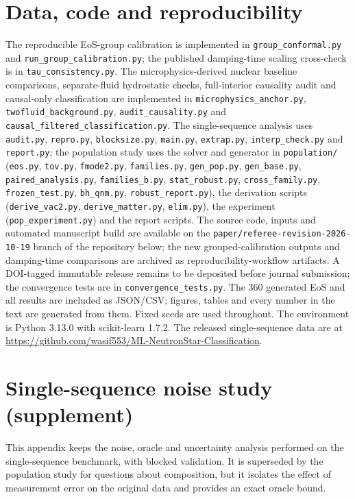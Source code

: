 \documentclass[11pt,a4paper]{article}
\begin{document}
\section*{Data, code and reproducibility}
The reproducible EoS-group calibration is implemented in \texttt{group\_conformal.py} and \texttt{run\_group\_calibration.py}; the published damping-time scaling cross-check is in \texttt{tau\_consistency.py}. The microphysics-derived nuclear baseline comparisons, separate-fluid hydrostatic checks, full-interior causality audit and causal-only classification are implemented in \texttt{microphysics\_anchor.py}, \texttt{twofluid\_background.py}, \texttt{audit\_causality.py} and \texttt{causal\_filtered\_classification.py}. The single-sequence analysis uses \texttt{audit.py}, \texttt{repro.py}, \texttt{blocksize.py}, \texttt{main.py}, \texttt{extrap.py}, \texttt{interp\_check.py} and \texttt{report.py}; the population study uses the solver and generator in \texttt{population/} (\texttt{eos.py}, \texttt{tov.py}, \texttt{fmode2.py}, \texttt{families.py}, \texttt{gen\_pop.py}, \texttt{gen\_base.py}, \texttt{paired\_analysis.py}, \texttt{families\_b.py}, \texttt{stat\_robust.py}, \texttt{cross\_family.py}, \texttt{frozen\_test.py}, \texttt{bh\_qnm.py}, \texttt{robust\_report.py}), the derivation scripts (\texttt{derive\_vac2.py}, \texttt{derive\_matter.py}, \texttt{elim.py}), the experiment (\texttt{pop\_experiment.py}) and the report scripts. The source code, inputs and automated manuscript build are available on the \texttt{paper/referee-revision-2026-10-19} branch of the repository below; the new grouped-calibration outputs and damping-time comparisons are archived as reproducibility-workflow artifacts. A DOI-tagged immutable release remains to be deposited before journal submission; the convergence tests are in \texttt{convergence\_tests.py}. The 360 generated EoS and all results are included as JSON/CSV; figures, tables and every number in the text are generated from them. Fixed seeds are used throughout. The environment is Python 3.13.0 with scikit-learn 1.7.2. The released single-sequence data are at \url{https://github.com/wasif553/ML-NeutronStar-Classification}.

\appendix
\section{Single-sequence noise study (supplement)}\label{sec:legacynoise}
This appendix keeps the noise, oracle and uncertainty analysis performed on the single-sequence benchmark, with blocked validation. It is superseded by the population study for questions about composition, but it isolates the effect of measurement error on the original data and provides an exact oracle bound.
\end{document}
